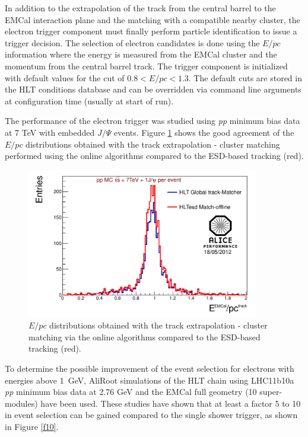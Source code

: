 In addition to the extrapolation of the track from the central barrel
to the EMCal interaction plane and the matching with a compatible nearby cluster, 
the electron trigger component must finally perform particle identification 
to issue a trigger decision. The selection of electron candidates is done 
using the $E/pc$ information where the energy is measured from the
EMCal cluster and the momentum from the central barrel track.
The trigger component is initialized with default values
for the cut of $0.8< E/pc <1.3$. The default cuts are stored in the HLT
conditions database and can be overridden via command line arguments
at configuration time (usually at start of run).

The performance of the electron trigger was studied using {\it pp} minimum 
bias data at 7 TeV with embedded $J/\Psi$ events.
Figure \ref{f9} shows the good agreement of the $E/pc$ distributions 
obtained with the track extrapolation - cluster matching 
performed using the online algorithms compared to the ESD-based tracking (red).

\begin{figure}[ht]
\includegraphics[width=24pc]{figures/Fig6HLTEoverP_performance.pdf}
\begin{center}
\caption{\label{f9} 
$E/pc$ distributions obtained with the track extrapolation - cluster matching
via the online algorithms compared to the ESD-based tracking (red).}
\end{center}
\end{figure}

To determine the possible improvement of the event selection 
for electrons with energies above 1~GeV, AliRoot simulations of the HLT chain using LHC11b10a {\it pp} minimum bias data 
at 2.76 GeV and the EMCal full geometry (10 super-modules)  have been used. These studies
have shown that at least a factor 5 to 10 in event selection can be gained compared to the single shower trigger, as shown in Figure \ref{f10}.

